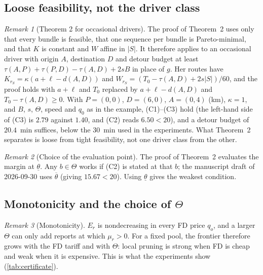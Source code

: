 \documentclass[11pt]{article}
\theoremstyle{definition}
\theoremstyle{remark}
\newtheorem{remark}{Remark}
\newcommand{\thl}{\underline{\theta}}
\newcommand{\thu}{\overline{\theta}}
\begin{document}
\subsection{Loose feasibility, not the driver class}

\begin{remark}[Theorem 2 for occasional drivers]\label{rem:polod}
The proof of Theorem~2 uses only that every bundle is feasible, that one
sequence per bundle is Pareto-minimal, and that $K$ is constant and $W$ affine
in $|S|$. It therefore applies to an occasional driver with origin $A$,
destination $D$ and detour budget at least $\tau(A,P)+\tau(P,D)-\tau(A,D)+2sB$
in place of $g$. Her routes have $K_{r_S}=\kappa(a+\ell-d(A,D))$ and
$W_{r_S}=(T_0-\tau(A,D)+2s|S|)/60$, and the proof holds with $a+\ell$ and $T_0$
replaced by $a+\ell-d(A,D)$ and $T_0-\tau(A,D)\ge0$. With $P=(0,0)$, $D=(6,0)$,
$A=(0,4)$ (km), $\kappa=1$, and $B$, $s$, $\Theta$, speed and $q_0$ as in the
example, (C1)--(C3) hold (the left-hand side of (C3) is $2.79$ against $1.40$,
and (C2) reads $6.50<20$), and a detour budget of $20.4$~min suffices, below
the $30$~min used in the experiments. What Theorem~2 separates is loose from
tight feasibility, not one driver class from the other.
\end{remark}

\begin{remark}[Choice of the evaluation point]
The proof of Theorem~2 evaluates the margin at $\thl$. Any $b\in\Theta$ works if
(C2) is stated at that $b$; the manuscript draft of 2026-09-30 uses $\thu$
(giving $15.67<20$). Using $\thl$ gives the weakest condition.
\end{remark}

\subsection{Monotonicity and the choice of \texorpdfstring{$\Theta$}{Theta}}

\begin{remark}[Monotonicity]\label{rem:monotone}
$E_r$ is nondecreasing in every FD price $q_o$, and a larger $\Theta$ can only
add reports at which $\mu_r>0$. For a fixed pool, the frontier therefore grows
with the FD tariff and with $\Theta$: local pruning is strong when FD is cheap
and weak when it is expensive. This is what the experiments show
(\cref{tab:certificate}).
\end{remark}
\end{document}
